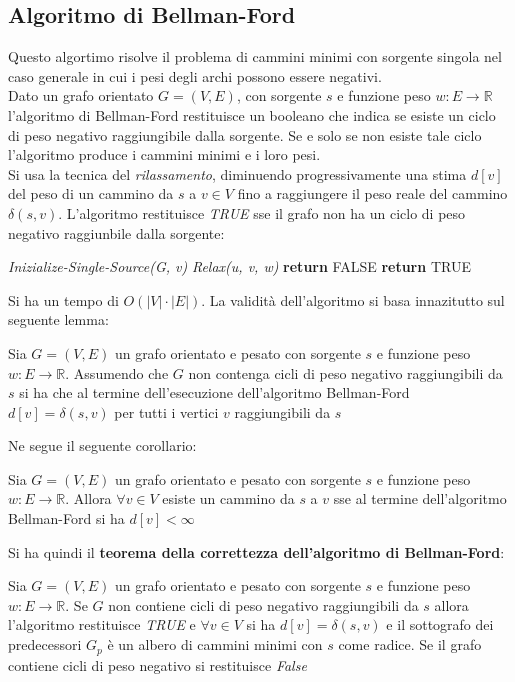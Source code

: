 \documentclass[a4paper,12pt, oneside]{book}
\begin{document}
\subsection{Algoritmo di Bellman-Ford}
Questo algortimo risolve il problema di cammini minimi con sorgente
singola nel caso generale in cui i pesi degli archi possono essere
negativi.\\ Dato un grafo orientato $G=(V,E)$, con sorgente $s$ e
funzione peso $w:E\to\mathbb{R}$ l'algoritmo di Bellman-Ford
restituisce un booleano che indica se esiste un ciclo di peso negativo
raggiungibile dalla sorgente. Se e solo se non esiste tale ciclo
l'algoritmo produce i cammini minimi e i loro pesi.\\
Si usa la tecnica del \textit{rilassamento}, diminuendo
progressivamente una stima $d[v]$ del peso di un cammino da $s$ a
$v\in V$ fino a raggiungere il peso reale del cammino
$\delta(s,v)$. L'algoritmo restituisce \textit{TRUE} sse il grafo non
ha un ciclo di peso negativo raggiunbile dalla sorgente:
\begin{algorithm}[H]
  \begin{algorithmic}
    \State \textit{Inizialize-Single-Source(G, v)}
    \State \textit{Relax(u, v, w)}
    \EndFor
    \EndFor
    \State \textbf{return} FALSE
    \EndIf
    \EndFor
    \State \textbf{return} TRUE
    \EndFunction
  \end{algorithmic}
\end{algorithm}
Si ha un tempo di $O(|V|\cdot |E|)$. La validità dell'algoritmo si
basa innazitutto sul seguente lemma:
\begin{lemma}
  Sia $G=(V,E)$ un grafo orientato e pesato con sorgente $s$ e
  funzione peso $w:E\to \mathbb{R}$. Assumendo che $G$ non contenga
  cicli di peso negativo raggiungibili da $s$ si ha che al termine
  dell'esecuzione dell'algoritmo Bellman-Ford $d[v]=\delta(s,v)$ per
  tutti i vertici $v$ raggiungibili da $s$
\end{lemma}
Ne segue il seguente corollario:
\begin{corollario}
  Sia $G=(V,E)$ un grafo orientato e pesato con sorgente $s$ e
  funzione peso $w:E\to \mathbb{R}$. Allora $\forall v\in V$ esiste un
  cammino da $s$ a $v$ sse al termine dell'algoritmo Bellman-Ford si
  ha $d[v]<\infty$ 
\end{corollario}
Si ha quindi il \textbf{teorema della correttezza dell'algoritmo di
  Bellman-Ford}:
\begin{teorema}
  Sia $G=(V,E)$ un grafo orientato e pesato con sorgente $s$ e
  funzione peso $w:E\to \mathbb{R}$. Se $G$ non contiene cicli di peso
  negativo raggiungibili da $s$ allora l'algoritmo restituisce
  \textit{TRUE} e $\forall v\in V$ si ha $d[v]=\delta(s,v)$ e il
  sottografo dei predecessori $G_p$ è un albero di cammini minimi
  con $s$ come radice. Se il grafo contiene cicli di peso negativo si
  restituisce \textit{False} 
\end{teorema}
\end{document}
